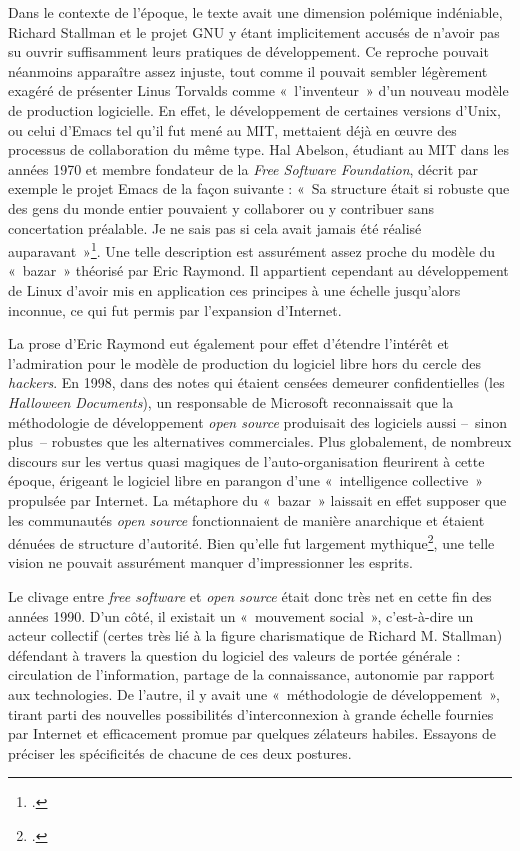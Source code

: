 \documentclass{FramateX}
\begin{document}
\begin{refsection}
Dans le contexte de l'époque, le texte avait une dimension polémique
indéniable, Richard Stallman et le projet GNU y étant implicitement
accusés de n'avoir pas su ouvrir suffisamment leurs pratiques de
développement. Ce reproche pouvait néanmoins apparaître assez
injuste, tout comme il pouvait sembler légèrement exagéré de présenter
Linus Torvalds comme «~l'inventeur~» d'un nouveau modèle de production
logicielle. En effet, le développement de certaines versions d'Unix, ou
celui d'Emacs tel qu'il fut mené au MIT, mettaient déjà en œuvre des
processus de collaboration du même type. Hal Abelson, étudiant au MIT
dans les années 1970 et membre fondateur de la \textit{Free Software
Foundation}, décrit par exemple le projet Emacs de la façon suivante :
«~Sa structure était si robuste que des gens du monde entier pouvaient
y collaborer ou y contribuer sans concertation préalable. Je ne sais
pas si cela avait jamais été réalisé auparavant~»\footnote{\cite[p.~117]{williamsrichard2010}.}. Une telle description est assurément assez proche du
modèle du «~bazar~» théorisé par Eric Raymond. Il appartient cependant
au développement de Linux d'avoir mis en application ces principes à
une échelle jusqu'alors inconnue, ce qui fut permis par l'expansion
d'Internet.

La prose d'Eric Raymond eut également pour effet
d'étendre l'intérêt et l'admiration pour le modèle de
production du logiciel libre hors du cercle des \textit{hackers}. En
1998, dans des notes qui étaient censées demeurer confidentielles (les
\textit{Halloween Documents}), un responsable de Microsoft
reconnaissait que la méthodologie de développement \textit{open source} produisait des logiciels aussi –~sinon plus~– robustes que les
alternatives commerciales. Plus globalement, de nombreux discours sur
les vertus quasi magiques de l'auto-organisation fleurirent à cette
époque, érigeant le logiciel libre en parangon d'une «~intelligence
collective~» propulsée par Internet. La métaphore du «~bazar~» laissait
en effet supposer que les communautés \textit{open source}
fonctionnaient de manière anarchique et étaient dénuées de structure
d'autorité. Bien qu'elle fut largement
mythique\footnote{\cite{Bezroukov1999}.}, une telle vision ne pouvait assurément manquer d'impressionner les esprits. 

Le clivage entre \textit{free software} et \textit{open source} était
donc très net en cette fin des années 1990. D'un côté, il existait un
«~mouvement social~», c'est-à-dire un acteur collectif
(certes très lié à la figure charismatique de Richard M. Stallman)
défendant à travers la question du logiciel des valeurs de portée
générale : circulation de l'information, partage de la
connaissance, autonomie par rapport aux technologies. De l'autre, il y
avait une «~méthodologie de développement~», tirant parti des nouvelles
possibilités d'interconnexion à grande échelle fournies par Internet et
efficacement promue par quelques zélateurs habiles. Essayons de
préciser les spécificités de chacune de ces deux postures.





\end{refsection}
\end{document}
